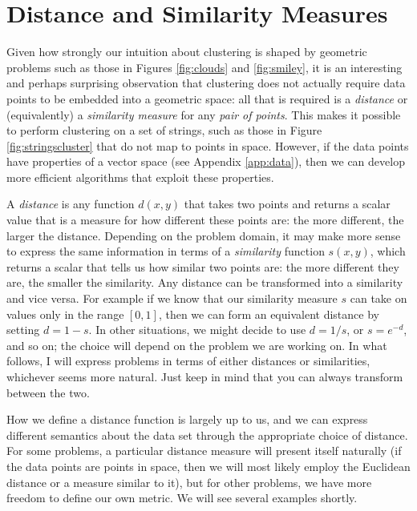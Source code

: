 

\section{Distance and Similarity Measures}


Given how strongly our intuition about clustering is shaped by
geometric problems such as those in Figures \ref{fig:clouds} and
\ref{fig:smiley}, it is an interesting and perhaps surprising
observation that clustering does not actually require data points to
be embedded into a geometric space: all that is required is a
\emph{distance} or (equivalently) a \emph{similarity measure} for any
\emph{pair of points}. This makes it possible to perform clustering on
a set of strings, such as those in Figure \ref{fig:stringscluster}
that do not map to points in space. However, if the data points have
properties of a vector space (see Appendix \ref{app:data}), then we
can develop more efficient algorithms that exploit these properties.


A \emph{distance} is any function $d(x,y)$ that takes two points and
returns a scalar value that is a measure for how different these
points are: the more different, the larger the distance.  Depending on
the problem domain, it may make more sense to express the same
information in terms of a \emph{similarity} function $s(x,y)$, which
returns a scalar that tells us how similar two points are: the more
different\vadjust{\pagebreak} they are, the smaller the similarity. Any distance can be
transformed into a similarity and vice versa. For example if we know
that our similarity measure $s$ can take on values only in the range
$[0,1]$, then we can form an equivalent distance by setting $d = 1-s$.
In other situations, we might decide to use $d = 1/s$, or $s =
e^{-d}$, and so on; the choice will depend on the problem we are
working on. In what follows, I will express problems in terms of
either distances or similarities, whichever seems more natural. Just
keep in mind that you can always transform between the two.

How we define a distance function is largely up to us, and we can
express different semantics about the data set through the appropriate
choice of distance. For some problems, a particular distance measure
will present itself naturally (if the data points are points in space,
then we will most likely employ the Euclidean distance or a measure
similar to it), but for other problems, we have more freedom to define
our own metric. We will see several examples shortly.

